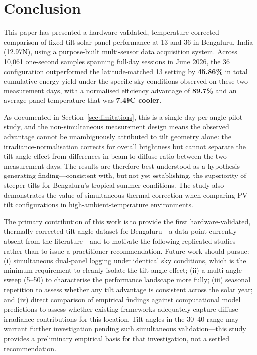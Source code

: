 \documentclass[conference]{IEEEtran}
\begin{document}
\section{Conclusion}
\label{sec:conclusion}

This paper has presented a hardware-validated, temperature-corrected comparison of fixed-tilt
solar panel performance at 13\degree{} and 36\degree{} in Bengaluru, India (12.97\degree{}N),
using a purpose-built multi-sensor data acquisition system. Across 10{,}061 one-second samples
spanning full-day sessions in June 2026, the 36\degree{} configuration outperformed the
latitude-matched 13\degree{} setting by \textbf{45.86\%} in total cumulative energy yield
under the specific sky conditions observed on these two measurement days, with a
normalised efficiency advantage of \textbf{89.7\%} and an average panel temperature that
was \textbf{7.49\degree{}C cooler}.

As documented in Section~\ref{sec:limitations}, this is a single-day-per-angle pilot study,
and the non-simultaneous measurement design means the observed advantage cannot be
unambiguously attributed to tilt geometry alone: the irradiance-normalisation corrects for
overall brightness but cannot separate the tilt-angle effect from differences in
beam-to-diffuse ratio between the two measurement days. The results are therefore best
understood as a hypothesis-generating finding---consistent with, but not yet establishing,
the superiority of steeper tilts for Bengaluru's tropical summer conditions. The study
also demonstrates the value of simultaneous thermal correction when comparing PV tilt
configurations in high-ambient-temperature environments.

The primary contribution of this work is to provide the first hardware-validated, thermally
corrected tilt-angle dataset for Bengaluru---a data point currently absent from the
literature---and to motivate the following replicated studies rather than to issue a
practitioner recommendation. Future work should pursue: (i) simultaneous dual-panel
logging under identical sky conditions, which is the minimum requirement to cleanly
isolate the tilt-angle effect; (ii) a multi-angle sweep (5\degree{}--50\degree{}) to
characterise the performance landscape more fully; (iii) seasonal repetition to assess
whether any tilt advantage is consistent across the solar year; and (iv) direct
comparison of empirical findings against computational model predictions to assess
whether existing frameworks adequately capture diffuse irradiance contributions for
this location. Tilt angles in the 30\degree{}--40\degree{} range may warrant further
investigation pending such simultaneous validation---this study provides a preliminary
empirical basis for that investigation, not a settled recommendation.
\end{document}
